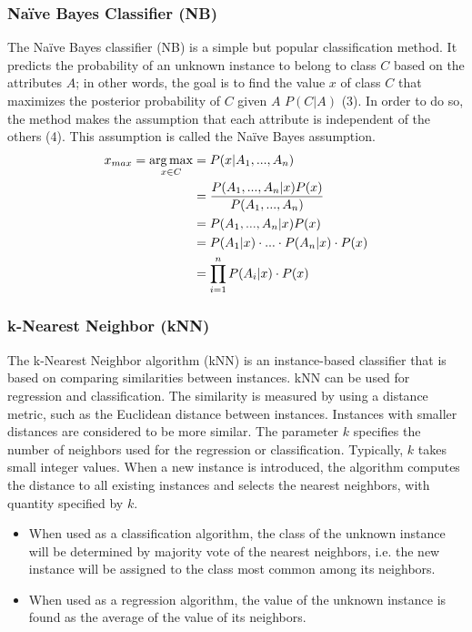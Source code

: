 	\subsubsection{Naïve Bayes Classifier (NB)}
	The Naïve Bayes classifier (NB) is a simple but popular classification method. It predicts the probability of an unknown instance to belong to class $C$ based on the attributes $A$; in other words, the goal is to find the value $x$ of class $C$ that maximizes the posterior probability of $C$ given $A$ $P(C|A)$ (3). In order to do so, the method makes the assumption that each attribute is independent of the others (4). This assumption is called the Naïve Bayes assumption.
	\begin{align}
			x_{max} = \operatorname*{arg\,max}_{x \in C} &= P(x|A_1, ..., A_n) \\
			&= \frac{P(A_1, ..., A_n|x)P(x)}{P(A_1, ..., A_n)} \\
			&= P(A_1, ..., A_n|x)P(x) \\
			&= P(A_1|x) \cdot ... \cdot P(A_n|x) \cdot P(x) \\
			&= \prod_{i = 1}^{n}P(A_i|x) \cdot P(x)
	\end{align}
	
	\subsubsection{k-Nearest Neighbor (kNN)}
	The k-Nearest Neighbor algorithm (kNN) is an instance-based classifier that is based on comparing similarities between instances. kNN can be used for regression and classification. The similarity is measured by using a distance metric, such as the Euclidean distance between instances. Instances with smaller distances are considered to be more similar. The parameter $k$ specifies the number of neighbors used for the regression or classification. Typically, $k$ takes small integer values. When a new instance is introduced, the algorithm computes the distance to all existing instances and selects the nearest neighbors, with quantity specified by $k$.   
	\begin{itemize}
		\item When used as a classification algorithm, the class of the unknown instance will be determined by majority vote of the nearest neighbors, i.e. the new instance will be assigned to the class most common among its neighbors. 
		\item When used as a regression algorithm, the value of the unknown instance is found as the average of the value of its neighbors.	 
	\end{itemize}
	
